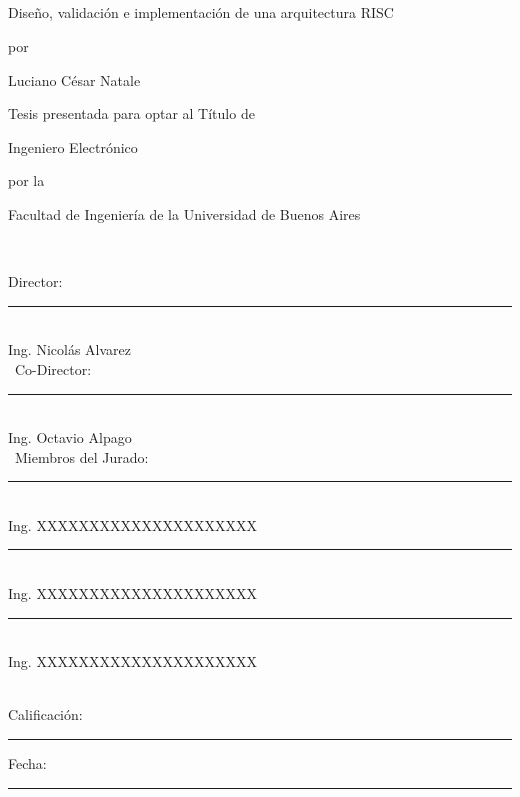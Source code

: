 \enlargethispage{2cm}
\thispagestyle{carat}

\

\

\

\

\begin{center}

\Large{Diseño, validación e implementación de una arquitectura RISC}

\vspace{0.4cm}

\normalsize{por}

\vspace{0.4cm}

\Large{Luciano César Natale}

\vspace{0.4cm}

\normalsize{Tesis presentada para optar al Título de}

\vspace{0.4cm}

\large{Ingeniero Electrónico}

\vspace{0.4cm}

\normalsize{por la}

\vspace{0.4cm}

\large{Facultad de Ingeniería de la Universidad de Buenos Aires}

\

\end{center}

Director:\\
\hspace*{5.5cm} \rule{7cm}{0.5pt} \\
\hspace*{7cm} Ing. Nicolás Alvarez \\
\
Co-Director:\\
\hspace*{5.5cm} \rule{7cm}{0.5pt} \\
\hspace*{7cm} Ing. Octavio Alpago \\
\
Miembros del Jurado:\\
\hspace*{5.5cm} \rule{7cm}{0.5pt} \\
\hspace*{7cm} Ing. XXXXXXXXXXXXXXXXXXXXX \\

\hspace*{5.5cm} \rule{7cm}{0.5pt} \\
\hspace*{7cm} Ing. XXXXXXXXXXXXXXXXXXXXX \\

\hspace*{5.5cm} \rule{7cm}{0.5pt} \\
\hspace*{7cm} Ing. XXXXXXXXXXXXXXXXXXXXX \\

\

\begin{center}
Calificación: \rule{4cm}{0.5pt} \hspace{1cm} Fecha: \rule{4cm}{0.5pt}\\
\end{center}

